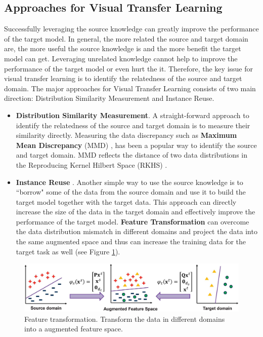 \subsection{Approaches for Visual Transfer Learning}
Successfully leveraging the source knowledge can greatly improve the performance of the target model. In general, the more related the source and target domain are, the more useful the source knowledge is and the more benefit the target model can get. Leveraging unrelated knowledge cannot help to improve the performance of the target model or even hurt the it. Therefore, the key issue for visual transfer learning is to identify the relatedness of the source and target domain. The major approaches for Visual Transfer Learning consists of two main direction: Distribution Similarity Measurement and Instance Reuse.

\begin{itemize}
	\item \textbf{Distribution Similarity Measurement}. A straight-forward approach to identify the relatedness of the source and target domain is to measure their similarity directly. Measuring the data discrepancy such as \textbf{Maximum Mean Discrepancy} (MMD) \cite{duan2009domain}, has been a popular way to identify the source and target domain. MMD reflects the distance of two data distributions in the Reproducing Kernel Hilbert Space (RKHS) \cite{aronszajn1950theory}.
	\item \textbf{Instance Reuse} \cite{lim2012transfer}. Another simple way to use the source knowledge is to ``borrow" some of the data from the source domain and use it to build the target model together with the target data. This approach can directly increase the size of the data in the target domain and effectively improve the performance of the target model.
	\textbf{Feature Transformation} \cite{duan2012learning} can overcome the data distribution mismatch in different domains and project the data into the same augmented space and thus can increase the training data for the target task as well (see Figure \ref{fig:intro:trans}).
\end{itemize}

\begin{figure}
	\centering
	\includegraphics[scale=.3]{introduction/fig/transformation.png}
	\caption{Feature transformation. Transform the data in different domains into a augmented feature space.}\label{fig:intro:trans}
\end{figure}

